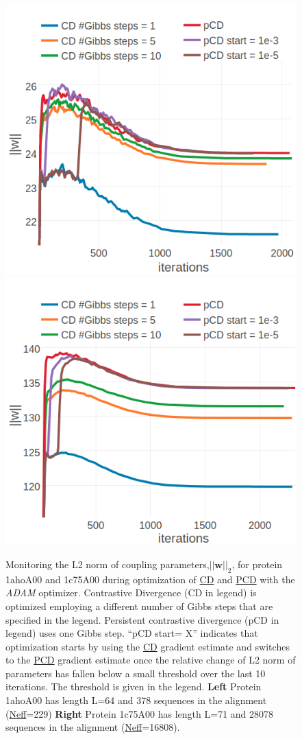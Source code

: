 \documentclass[11pt,a4paper,twoside]{book}
\newcommand{\w}{\mathbf{w}}
\theoremstyle{definition}
\theoremstyle{definition}
\theoremstyle{remark}
\begin{document}
\begin{figure}

{\centering \includegraphics[width=0.49\linewidth]{img/full_likelihood/adam/1ahoA00_parameter_norm_pcd_gibbs} \includegraphics[width=0.49\linewidth]{img/full_likelihood/adam/1c75A00_parameter_norm_pcd_gibbs} 

}

\caption{Monitoring the L2 norm of coupling
parameters,\(||\w||_2\), for protein 1ahoA00 and 1c75A00 during
optimization of \protect\hyperlink{abbrev}{CD} and
\protect\hyperlink{abbrev}{PCD} with the \emph{ADAM} optimizer.
Contrastive Divergence (CD in legend) is optimized employing a different
number of Gibbs steps that are specified in the legend. Persistent
contrastive divergence (pCD in legend) uses one Gibbs step. ``pCD start=
X'' indicates that optimization starts by using the
\protect\hyperlink{abbrev}{CD} gradient estimate and switches to the
\protect\hyperlink{abbrev}{PCD} gradient estimate once the relative
change of L2 norm of parameters has fallen below a small threshold over
the last 10 iterations. The threshold is given in the legend.
\textbf{Left} Protein 1ahoA00 has length L=64 and 378 sequences in the
alignment (\protect\hyperlink{abbrev}{Neff}=229) \textbf{Right} Protein
1c75A00 has length L=71 and 28078 sequences in the alignment
(\protect\hyperlink{abbrev}{Neff}=16808).}\label{fig:adam-gibbs-pcd}
\end{figure}
\end{document}
